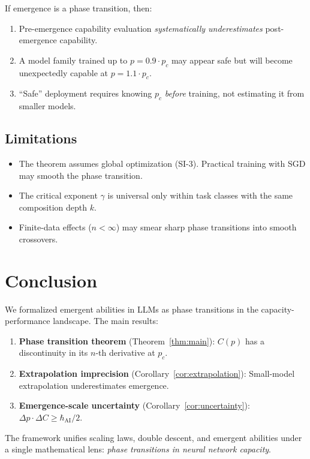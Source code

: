 \documentclass[12pt]{article}
\theoremstyle{definition}
\theoremstyle{remark}
\begin{document}
If emergence is a phase transition, then:
\begin{enumerate}
  \item Pre-emergence capability evaluation \emph{systematically underestimates} post-emergence capability.
  \item A model family trained up to $p = 0.9 \cdot p_c$ may appear safe but will become unexpectedly capable at $p = 1.1 \cdot p_c$.
  \item ``Safe'' deployment requires knowing $p_c$ \emph{before} training, not estimating it from smaller models.
\end{enumerate}

\subsection{Limitations}

\begin{itemize}
  \item The theorem assumes global optimization (SI-3). Practical training with SGD may smooth the phase transition.
  \item The critical exponent $\gamma$ is universal only within task classes with the same composition depth $k$.
  \item Finite-data effects ($n < \infty$) may smear sharp phase transitions into smooth crossovers.
\end{itemize}

\section{Conclusion}

We formalized emergent abilities in LLMs as phase transitions in the capacity-performance landscape. The main results:

\begin{enumerate}
  \item \textbf{Phase transition theorem} (Theorem~\ref{thm:main}): $C(p)$ has a discontinuity in its $n$-th derivative at $p_c$.
  \item \textbf{Extrapolation imprecision} (Corollary~\ref{cor:extrapolation}): Small-model extrapolation underestimates emergence.
  \item \textbf{Emergence-scale uncertainty} (Corollary~\ref{cor:uncertainty}): $\Delta p \cdot \Delta C \geq \hbar_{\mathrm{AI}}/2$.
\end{enumerate}

The framework unifies scaling laws, double descent, and emergent abilities under a single mathematical lens: \emph{phase transitions in neural network capacity}.
\end{document}
